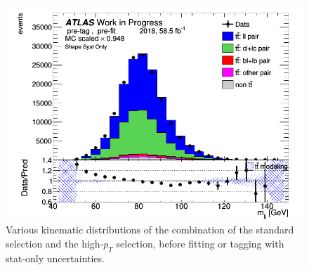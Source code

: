 \documentclass[letterpaper,12pt]{article}
\begin{document}
\begin{figure}[H]
\begin{minipage}[b]{.45\textwidth}
	\end{minipage}\hfill
	\begin{minipage}[b]{.45\textwidth}
	\centering
	\includegraphics[width=1\textwidth]{Distribution_March_highpT/DataMC_mjj.png}
	\end{minipage}
	\caption{Various kinematic distributions of the combination of the 
	standard selection and the high-$p_T$ selection, before fitting or 
	tagging with stat-only uncertainties.} \label{fig:highpT_selection}
\end{figure}
\end{document}
